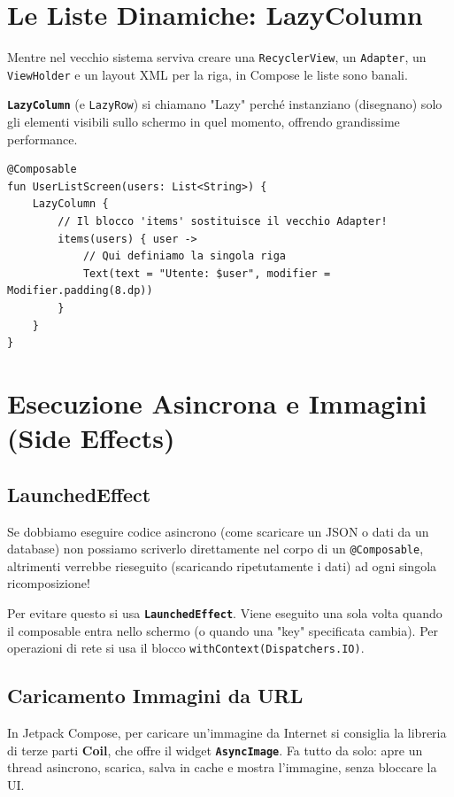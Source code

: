 \section{Le Liste Dinamiche: LazyColumn}
Mentre nel vecchio sistema serviva creare una \texttt{RecyclerView}, un \texttt{Adapter}, un \texttt{ViewHolder} e un
layout XML per la riga, in Compose le liste sono banali.

\textbf{\texttt{LazyColumn}} (e \texttt{LazyRow}) si chiamano "Lazy" perché instanziano (disegnano) solo gli elementi visibili sullo schermo in quel momento, offrendo grandissime performance.

\begin{lstlisting}[caption={Creare una lista in Compose}, label={lst:lazycolumn}]
@Composable
fun UserListScreen(users: List<String>) {
    LazyColumn {
        // Il blocco 'items' sostituisce il vecchio Adapter!
        items(users) { user ->
            // Qui definiamo la singola riga
            Text(text = "Utente: $user", modifier = Modifier.padding(8.dp))
        }
    }
}
\end{lstlisting}

\section{Esecuzione Asincrona e Immagini (Side Effects)}

\subsection{LaunchedEffect}
Se dobbiamo eseguire codice asincrono (come scaricare un JSON o dati da un database) non possiamo scriverlo direttamente
nel corpo di un \texttt{@Composable}, altrimenti verrebbe rieseguito (scaricando ripetutamente i dati) ad ogni singola ricomposizione!

Per evitare questo si usa \textbf{\texttt{LaunchedEffect}}.
Viene eseguito una sola volta quando il composable entra nello schermo (o quando una "key" specificata cambia).
Per operazioni di rete si usa il blocco \texttt{withContext(Dispatchers.IO)}.

\subsection{Caricamento Immagini da URL}
In Jetpack Compose, per caricare un'immagine da Internet si consiglia la libreria di terze parti \textbf{Coil}, che offre il widget \textbf{\texttt{AsyncImage}}.
Fa tutto da solo: apre un thread asincrono, scarica, salva in cache e mostra l'immagine, senza bloccare la UI.

